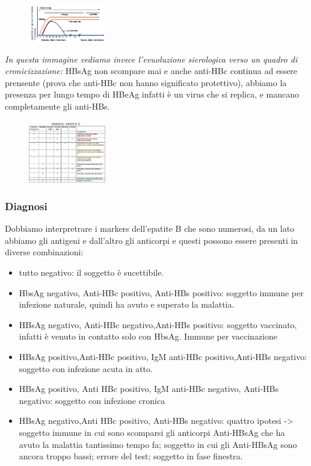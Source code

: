 \begin{figure}[!ht]
\centering
	\includegraphics[width=0.3\textwidth]{11/image2.png}
	\end{figure}

  \emph{In questa immagine vediamo invece l'evuoluzione sierologica
  verso un quadro di cronicizzazione:} HBsAg non scompare mai e anche
  anti-HBc continua ad essere prensente (prova che anti-HBc non hanno
  significato protettivo), abbiamo la presenza per lungo tempo di HBeAg
  infatti è un virus che si replica, e mancano completamente gli
  anti-HBs.

\begin{figure}[!ht]
\centering
	\includegraphics[width=0.3\textwidth]{11/image3.jpeg}
	\end{figure}

\subsubsection{Diagnosi}

  Dobbiamo interpretrare i markers dell'epatite B che sono numerosi, da
  un lato abbiamo gli antigeni e dall'altro gli anticorpi e questi
  possono essere presenti in diverse combinazioni:

\begin{itemize}
\item
  tutto negativo: il soggetto è sucettibile.
\item
  HbsAg negativo, Anti-HBc positivo, Anti-HBs positivo: soggetto immune
  per infezione naturale, quindi ha avuto e superato la malattia.
\item
  HBsAg negativo, Anti-HBc negativo,Anti-HBs positivo: soggetto
  vaccinato, infatti è venuto in contatto solo con HbsAg. Immune per
  vaccinazione
\item
  HBsAg positivo,Anti-HBc positivo, IgM anti-HBc positivo,Anti-HBs
  negativo: soggetto con infezione acuta in atto.
\item
  HBsAg positivo, Anti HBc positivo, IgM anti-HBc negativo, Anti-HBs
  negativo: soggetto con infezione cronica
\item
  HBsAg negativo,Anti HBc positivo, Anti-HBs negativo: quattro ipotesi ->
  soggetto immune in cui sono scomparsi gli anticorpi Anti-HBsAg che ha
  avuto la malattia tantissimo tempo fa; soggetto in cui gli Anti-HBsAg
  sono ancora troppo bassi; errore del test; soggetto in fase finestra.
\end{itemize}


